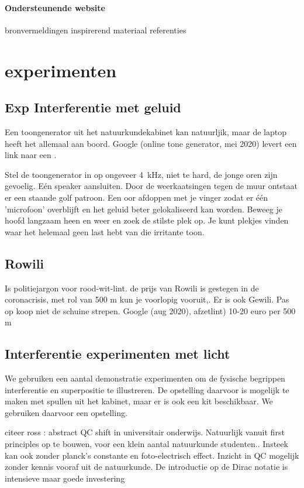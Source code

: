 \documentclass[../../main.tex]{subfiles}
\begin{document}
\paragraph{Ondersteunende website}


bronvermeldingen
inspirerend materiaal 
referenties

\section{experimenten}

\subsection{Exp Interferentie met geluid}
Een toongenerator uit het natuurkundekabinet kan natuurljik, maar de laptop heeft het allemaal aan boord. Google (online tone generator, mei 2020) levert een link naar een .

Stel de toongenerator in op ongeveer \SI{4}{\kilo\hertz}, niet te hard, de jonge oren zijn gevoelig. E\'en speaker aansluiten. Door de weerkaatsingen tegen de muur ontstaat er een staande golf patroon. Een oor afdoppen met je vinger zodat er \'e\'en 'microfoon' overblijft en het geluid beter gelokaliseerd kan worden. Beweeg je hoofd langzaam heen en weer en zoek de stilste plek op. Je kunt plekjes vinden waar het helemaal geen last hebt van die irritante toon.

\subsection{Rowili}
Is politiejargon voor rood-wit-lint. de prijs van Rowili is gestegen in de coronacrisis, met rol van 500 m kun je voorlopig vooruit,. Er is ook Gewili. Pas op koop niet de schuine strepen.  Google (aug 2020), afzetlint) 10-20 euro per 500 m

\subsection{Interferentie experimenten met licht}
We gebruiken een aantal demonstratie experimenten om de fysische begrippen interferentie en superpositie te illustreren.
De opstelling daarvoor is mogelijk te maken met spullen uit het kabinet, maar er is ook een kit beschikbaar. We gebruiken daarvoor een opstelling. 

citeer ross \cite{ross2020computer} : abstract QC shift in universitair onderwijs. Natuurlijk vanuit first principles op te bouwen, voor een klein aantal natuurkunde studenten..
Insteek kan ook zonder planck's constante en foto-electrisch effect. Inzicht in QC mogelijk zonder kennis vooraf uit de natuurkunde.
De introductie op de Dirac notatie is intensieve maar goede investering
\end{document}
